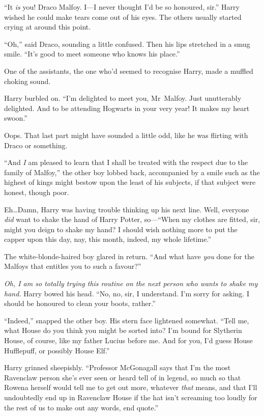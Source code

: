 “It \emph{is} you! Draco Malfoy. I—I never thought I’d be so honoured, sir.” Harry wished he could make tears come out of his eyes. The others usually started crying at around this point.

“Oh,” said Draco, sounding a little confused. Then his lips stretched in a smug smile.
“It’s good to meet someone who knows his place.”

One of the assistants, the one who’d seemed to recognise Harry, made a muffled choking sound.

Harry burbled on.
“I’m delighted to meet you, Mr~Malfoy. Just unutterably delighted. And to be attending Hogwarts in your very year! It makes my heart swoon.”

Oops. That last part might have sounded a little odd, like he was flirting with Draco or something.

“And \emph{I} am pleased to learn that I shall be treated with the respect due to the family of Malfoy,” the other boy lobbed back, accompanied by a smile such as the highest of kings might bestow upon the least of his subjects, if that subject were honest, though poor.

Eh…Damn, Harry was having trouble thinking up his next line. Well, everyone \emph{did} want to shake the hand of Harry Potter, so—“When my clothes are fitted, sir, might you deign to shake my hand? I should wish nothing more to put the capper upon this day, nay, this month, indeed, my whole lifetime.”

The white-blonde-haired boy glared in return.
“And what have \emph{you} done for the Malfoys that entitles you to such a favour?”

\emph{Oh, I am so totally trying this routine on the next person who wants to shake my hand.} Harry bowed his head.
“No, no, sir, I understand. I’m sorry for asking. I should be honoured to clean your boots, rather.”

“Indeed,” snapped the other boy. His stern face lightened somewhat.
“Tell me, what House do you think you might be sorted into? I’m bound for Slytherin House, of course, like my father Lucius before me. And for you, I’d guess House Hufflepuff, or possibly House Elf.”

Harry grinned sheepishly.
“Professor McGonagall says that I’m the most Ravenclaw person she’s ever seen or heard tell of in legend, so much so that Rowena herself would tell me to get out more, whatever \emph{that} means, and that I’ll undoubtedly end up in Ravenclaw House if the hat isn’t screaming too loudly for the rest of us to make out any words, end quote.”

